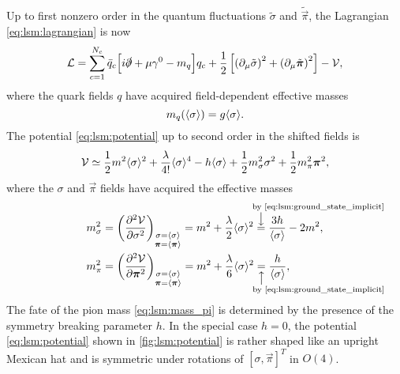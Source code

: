 Up to first nonzero order in the quantum fluctuations $\tilde\sigma$ and $\tilde{\vec\pi}$, the Lagrangian \eqref{eq:lsm:lagrangian} is now
\begin{equation}
	\lagr = \sum_{c=1}^{N_c} \bar{q}_c \Big[ i \slashed\partial + \mu \gamma^0 - m_q \Big] q_c
	      + \frac12 \left[ \left( \partial_\mu \tilde{\sigma} \right)^2 + \left( \partial_\mu \tilde{\vec\pi} \right)^2 \right] - \pot , %
\end{equation}
where the quark fields $q$ have acquired field-dependent effective masses
\begin{equation}
	m_q(\langle \sigma \rangle) = g \langle \sigma \rangle .
\label{eq:lsm:mass_quark}
\end{equation}
The potential \eqref{eq:lsm:potential} up to second order in the shifted fields is
\begin{equation}
	\mathcal{V} \simeq \frac12 m^2 \langle \sigma \rangle^2 + \frac{\lambda}{4!} \langle \sigma \rangle^4 - h \langle \sigma \rangle + \frac12 m_\sigma^2 \sigma^2  + \frac12 m_\pi^2 {\bm{\pi}}^2 ,
\label{eq:lsm:potential_shifted}
\end{equation}
where the $\sigma$ and $\vec\pi$ fields have acquired the effective masses
\begin{subequations}
\begin{align}
	m_\sigma^2 &= \pdv[2]{\pot}{\sigma}_{\substack{\sigma=\avg{\sigma}\\\vec{\pi}=\avg{\vec{\pi}}}}    = m^2 + \frac{\lambda}{2} \avg{\sigma}^2 \equalexplabove{\text{by \eqref{eq:lsm:ground_state_implicit}}} \frac{3h}{\avg{\sigma}} - 2 m^2 , \label{eq:lsm:mass_sigma} \\
	m_\pi^2    &= \pdv[2]{\pot}{\vec{\pi}}_{\substack{\sigma=\avg{\sigma}\\\vec{\pi}=\avg{\vec{\pi}}}} = m^2 + \frac{\lambda}{6} \avg{\sigma}^2 \equalexplbelow{\text{by \eqref{eq:lsm:ground_state_implicit}}} \frac{h}{\avg{\sigma}} , \label{eq:lsm:mass_pi}
\end{align}%
\label{eq:lsm:mass_sigmapi}%
\end{subequations}%
The fate of the pion mass \eqref{eq:lsm:mass_pi} is determined by the presence of the symmetry breaking parameter $h$.
In the special case $h = 0$, the potential \eqref{eq:lsm:potential} shown in \cref{fig:lsm:potential} is rather shaped like an upright Mexican hat and is symmetric under rotations of $[\sigma,\vec{\pi}]^T$ in $O(4)$.
